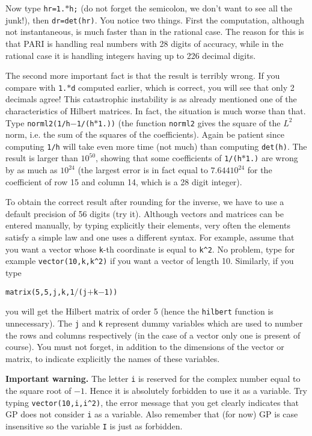 Now type {\tt hr=1.$*$h;} (do not forget the semicolon, we don't want to see
all the junk!), then {\tt dr=det(hr)}. You notice two things. First the
computation, although not instantaneous, is much faster than in the rational
case. The reason for this is that PARI is handling real numbers with 28 digits
of accuracy, while in the rational case it is handling integers having up to
226 decimal digits.

The second more important fact is that the result is terribly wrong. If you
compare with {\tt 1.$*$d} computed earlier, which is correct, you will see that
only 2 decimals agree! This catastrophic instability is as already 
mentioned one of the characteristics of Hilbert matrices. In fact, the 
situation is much worse than that. Type {\tt norml2(1/h$-$1/(h$*$1.))}
(the function {\tt norml2} gives the square of the $L^2$ norm, i.e. the sum of
the squares of the coefficients). Again be patient since computing {\tt 1/h}
will take even more time (not much) than computing {\tt det(h)}. The result
is larger than $10^{50}$, showing that some coefficients of {\tt 1/(h$*$1.)}
are wrong by as much as $10^{24}$ (the largest error is in fact equal
to $7.644 10^{24}$ for the coefficient of row 15 and column 14, which is a
28 digit integer).

To obtain the correct result after rounding for the inverse, we have to use
a default precision of 56 digits (try it).
\smallskip
Although vectors and matrices can be entered manually, by typing explicitly
their elements, very often the elements satisfy a simple law and one uses a
different syntax. For example, assume that you want a vector whose {\tt k}-th
coordinate is equal to {\tt k\^{}2}. No problem, type for example
{\tt vector(10,k,k\^{}2)} if you want a vector of length 10. Similarly, if
you type 

\centerline{{\tt matrix(5,5,j,k,1$/$(j$+$k$-$1))}}

\noindent you will get the Hilbert
matrix of order 5 (hence the {\tt hilbert} function is unnecessary).
The {\tt j} and {\tt k} represent dummy variables which are used to number
the rows and columns respectively (in the case of a vector only one is present
of course). You must not forget, in addition to the dimensions of the vector
or matrix, to indicate explicitly the names of these variables.

{\bf Important warning.} The letter {\tt i} is reserved for the complex number
equal to the square root of $-1$. Hence it is absolutely forbidden to use it
as a variable. Try typing {\tt vector(10,i,i\^{}2)}, the error message that you
get clearly indicates that GP does not consider {\tt i} as a variable.
Also remember that (for now) GP is case insensitive so the variable {\tt I} is
just as forbidden.

